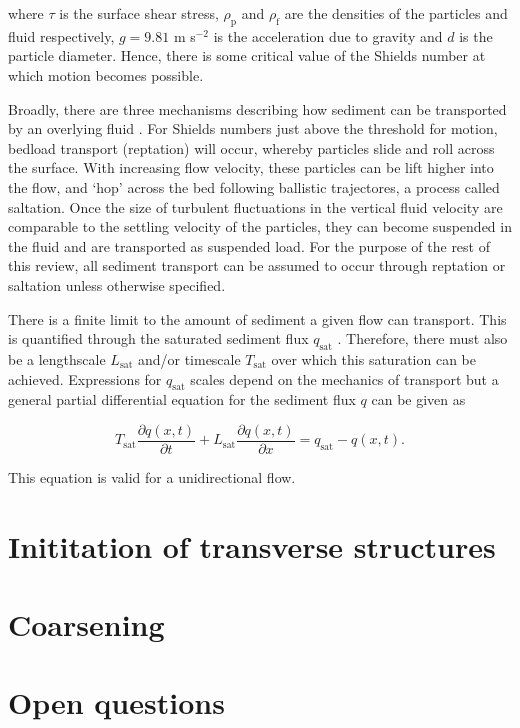 \documentclass[12pt]{article}
\begin{document}
where $\tau$ is the surface shear stress, $\rho_{\text{p}}$ and $\rho_{\text{f}}$ are the densities of the particles and fluid respectively, $g = 9.81$ m s$^{-2}$ is the acceleration due to gravity and $d$ is the particle diameter. Hence, there is some critical value of the Shields number at which motion becomes possible.

Broadly, there are three mechanisms describing how sediment can be transported by an overlying fluid \citep{Bagnold41}. For Shields numbers just above the threshold for motion, bedload transport (reptation) will occur, whereby particles slide and roll across the surface. With increasing flow velocity, these particles can be lift higher into the flow, and `hop' across the bed following ballistic trajectores, a process called saltation. Once the size of turbulent fluctuations in the vertical fluid velocity are comparable to the settling velocity of the particles, they can become suspended in the fluid and are transported as suspended load. For the purpose of the rest of this review, all sediment transport can be assumed to occur through reptation or saltation unless otherwise specified. 

There is a finite limit to the amount of sediment a given flow can transport. This is quantified through the saturated sediment flux $q_{\text{sat}}$ \citep{Bagnold41, Owen64}. Therefore, there must also be a lengthscale $L_{\text{sat}}$ and/or timescale $T_{\text{sat}}$ over which this saturation can be achieved. Expressions for $q_{\text{sat}}$ scales depend on the mechanics of transport but a general partial differential equation for the sediment flux $q$ can be given as \citep{Charru13}

\begin{equation}
\label{equ:sed_flux}
T_{\text{sat}} \frac{\partial q(x,t)}{\partial t} + L_{\text{sat}} \frac{\partial q(x,t)}{\partial x} = q_{\text{sat}} - q(x,t) .
\end{equation}

This equation is valid for a unidirectional flow.
\section{Inititation of transverse structures}
\label{sec:init}

\section{Coarsening}
\label{sec:coarse}

\section{Open questions}
\label{sec:openQs}





\end{document}
